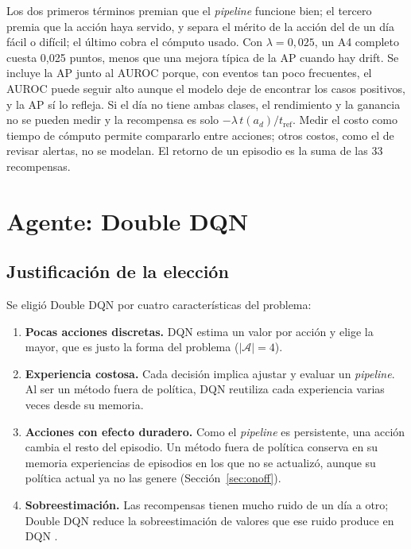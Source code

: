 Los dos primeros términos premian que el \textit{pipeline} funcione bien; el tercero premia que
la acción haya servido, y separa el mérito de la acción del de un día fácil o difícil; el último
cobra el cómputo usado. Con $\lambda = 0{,}025$, un A4 completo cuesta 0,025 puntos, menos que
una mejora típica de la AP cuando hay drift. Se incluye la AP junto al AUROC porque, con eventos
tan poco frecuentes, el AUROC puede seguir alto aunque el modelo deje de encontrar los casos
positivos, y la AP sí lo refleja. Si el día no tiene ambas clases, el rendimiento y la ganancia
no se pueden medir y la recompensa es solo $-\lambda\,t(a_d)/t_{\text{ref}}$. Medir el costo como
tiempo de cómputo permite compararlo entre acciones; otros costos, como el de revisar alertas,
no se modelan. El retorno de un episodio es la suma de las 33 recompensas.

\section{Agente: Double DQN}
\label{sec:met_ddqn}

\subsection{Justificación de la elección}

Se eligió Double DQN por cuatro características del problema:

\begin{enumerate}
    \item \textbf{Pocas acciones discretas.} DQN estima un valor por acción y elige la mayor,
    que es justo la forma del problema ($|\mathcal{A}| = 4$).
    \item \textbf{Experiencia costosa.} Cada decisión implica ajustar y evaluar un
    \textit{pipeline}. Al ser un método fuera de política, DQN reutiliza cada experiencia
    varias veces desde su memoria.
    \item \textbf{Acciones con efecto duradero.} Como el \textit{pipeline} es persistente, una
    acción cambia el resto del episodio. Un método fuera de política conserva en su memoria
    experiencias de episodios en los que no se actualizó, aunque su política actual ya no las
    genere (Sección~\ref{sec:onoff}).
    \item \textbf{Sobreestimación.} Las recompensas tienen mucho ruido de un día a otro; Double
    DQN reduce la sobreestimación de valores que ese ruido produce en DQN
    \cite{vanhasselt2016ddqn}.
\end{enumerate}

